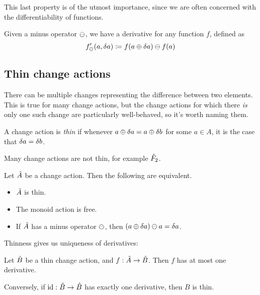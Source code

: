 This last property is of the utmost importance, since we are often concerned with the differentiability
of functions.

\begin{defn}
  Given a minus operator $\ominus$, we have a derivative for any function $f$,
  defined as
  $$f'_\ominus(a, \delta a) \coloneqq f(a \oplus \delta a) \ominus f(a)$$
\end{defn}

\subsection{Thin change actions}
\label{sec:thin}

There can be multiple changes representing the difference
between two elements. This is true for many change actions, but the change
actions for which there \emph{is} only one such change are particularly
well-behaved, so it's worth naming them.

\begin{defn}
  A change action is \textit{thin} if whenever $a \oplus \delta a
  = a \oplus \delta b$ for some $a \in A$, it is the case that $\delta a = \delta b$.
\end{defn}

Many change actions are not thin, for example $\hat{F}_2$.

\begin{prop}
  Let $\hat{A}$ be a change action. Then the following are equivalent.
  \begin{itemize}
    \item $\hat{A}$ is thin.
    \item The monoid action is free.
    \item If $\hat{A}$ has a minus operator $\ominus$, then $(a \oplus \delta a)
      \ominus a = \delta a$.
  \end{itemize}
\end{prop}

Thinness gives us uniqueness of derivatives:

\begin{prop}
  Let $\hat{B}$ be a thin change action, and $f: \hat{A} \rightarrow \hat{B}$. Then $f$ has at
  most one derivative.

  Conversely, if $\textrm{id}: \hat{B} \rightarrow \hat{B}$ has exactly one derivative, then
  $B$ is thin.
\end{prop}

